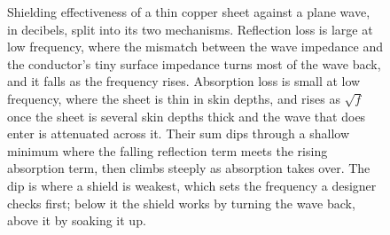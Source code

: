 \begin{figure}[htbp]
\centering
{}
\caption[Shielding effectiveness of a copper sheet]{Shielding effectiveness
of a thin copper sheet against a plane wave, in decibels, split into its two
mechanisms. Reflection loss is large at low frequency, where the mismatch
between the wave impedance and the conductor's tiny surface impedance turns
most of the wave back, and it falls as the frequency rises. Absorption loss
is small at low frequency, where the sheet is thin in skin depths, and rises
as $\sqrt{f}$ once the sheet is several skin depths thick and the wave that
does enter is attenuated across it. Their sum dips through a shallow minimum
where the falling reflection term meets the rising absorption term, then
climbs steeply as absorption takes over. The dip is where a shield is
weakest, which sets the frequency a designer checks first; below it the shield
works by turning the wave back, above it by soaking it up.}
\label{fig:vol04ch08:shielding-effectiveness}
\end{figure}
